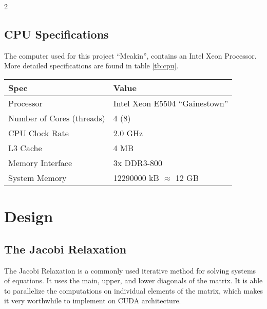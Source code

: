\documentclass[10pt]{article}
\begin{document}
\begin{multicols}{2}
  \subsection{CPU Specifications}
  The computer used for this project ``Meakin'', contains an Intel Xeon Processor. More detailed specifications are found in table \ref{tb:cpu}.
  \begin{table*}[!ht]\centering
    \begin{tabular}{@{}l l@{}}\toprule
      \bf{Spec}                     &   \bf{Value}                      \\
      \hline
      Processor                     &   Intel Xeon E5504 ``Gainestown'' \\
      Number of Cores (threads)     &   4 (8)                           \\
      CPU Clock Rate                &   2.0 GHz                         \\
      L3 Cache                      &   4 MB                            \\
      Memory Interface              &   3x DDR3-800                     \\
      System Memory                 &   12290000 kB $\approx$ 12 GB     \\
      \hline
    \end{tabular}
    \caption{Meakin CPU specifications}
    \label{tb:cpu}
  \end{table*}

  \section{Design}
  \label{sec:design}
  \subsection{The Jacobi Relaxation}
  The Jacobi Relaxation is a commonly used iterative method for solving systems of equations.
  It uses the main, upper, and lower diagonals of the matrix.
  It is able to parallelize the computations on individual elements of the matrix, which makes it very worthwhile to implement on CUDA architecture.


\end{multicols}
\end{document}
